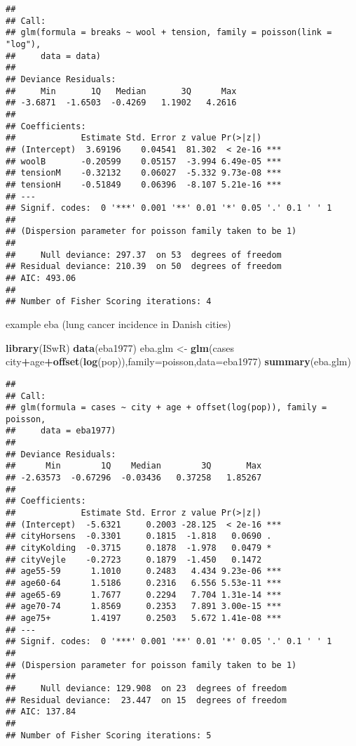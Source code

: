 \documentclass[
]{article}
\newenvironment{Shaded}{\begin{snugshade}}{\end{snugshade}}
\newcommand{\DataTypeTok}[1]{\textcolor[rgb]{0.13,0.29,0.53}{#1}}
\newcommand{\KeywordTok}[1]{\textcolor[rgb]{0.13,0.29,0.53}{\textbf{#1}}}
\newcommand{\NormalTok}[1]{#1}
\newcommand{\OperatorTok}[1]{\textcolor[rgb]{0.81,0.36,0.00}{\textbf{#1}}}
\newcommand{\StringTok}[1]{\textcolor[rgb]{0.31,0.60,0.02}{#1}}
\begin{document}
\begin{verbatim}
## 
## Call:
## glm(formula = breaks ~ wool + tension, family = poisson(link = "log"), 
##     data = data)
## 
## Deviance Residuals: 
##     Min       1Q   Median       3Q      Max  
## -3.6871  -1.6503  -0.4269   1.1902   4.2616  
## 
## Coefficients:
##             Estimate Std. Error z value Pr(>|z|)    
## (Intercept)  3.69196    0.04541  81.302  < 2e-16 ***
## woolB       -0.20599    0.05157  -3.994 6.49e-05 ***
## tensionM    -0.32132    0.06027  -5.332 9.73e-08 ***
## tensionH    -0.51849    0.06396  -8.107 5.21e-16 ***
## ---
## Signif. codes:  0 '***' 0.001 '**' 0.01 '*' 0.05 '.' 0.1 ' ' 1
## 
## (Dispersion parameter for poisson family taken to be 1)
## 
##     Null deviance: 297.37  on 53  degrees of freedom
## Residual deviance: 210.39  on 50  degrees of freedom
## AIC: 493.06
## 
## Number of Fisher Scoring iterations: 4
\end{verbatim}

example eba (lung cancer incidence in Danish cities)

\begin{Shaded}
\begin{Highlighting}[]
\KeywordTok{library}\NormalTok{(ISwR) }
\KeywordTok{data}\NormalTok{(eba1977)}
\NormalTok{eba.glm <-}\StringTok{ }\KeywordTok{glm}\NormalTok{(cases }\OperatorTok{~}\StringTok{ }\NormalTok{city}\OperatorTok{+}\NormalTok{age}\OperatorTok{+}\KeywordTok{offset}\NormalTok{(}\KeywordTok{log}\NormalTok{(pop)),}\DataTypeTok{family=}\NormalTok{poisson,}\DataTypeTok{data=}\NormalTok{eba1977)}
\KeywordTok{summary}\NormalTok{(eba.glm)}
\end{Highlighting}
\end{Shaded}

\begin{verbatim}
## 
## Call:
## glm(formula = cases ~ city + age + offset(log(pop)), family = poisson, 
##     data = eba1977)
## 
## Deviance Residuals: 
##      Min        1Q    Median        3Q       Max  
## -2.63573  -0.67296  -0.03436   0.37258   1.85267  
## 
## Coefficients:
##             Estimate Std. Error z value Pr(>|z|)    
## (Intercept)  -5.6321     0.2003 -28.125  < 2e-16 ***
## cityHorsens  -0.3301     0.1815  -1.818   0.0690 .  
## cityKolding  -0.3715     0.1878  -1.978   0.0479 *  
## cityVejle    -0.2723     0.1879  -1.450   0.1472    
## age55-59      1.1010     0.2483   4.434 9.23e-06 ***
## age60-64      1.5186     0.2316   6.556 5.53e-11 ***
## age65-69      1.7677     0.2294   7.704 1.31e-14 ***
## age70-74      1.8569     0.2353   7.891 3.00e-15 ***
## age75+        1.4197     0.2503   5.672 1.41e-08 ***
## ---
## Signif. codes:  0 '***' 0.001 '**' 0.01 '*' 0.05 '.' 0.1 ' ' 1
## 
## (Dispersion parameter for poisson family taken to be 1)
## 
##     Null deviance: 129.908  on 23  degrees of freedom
## Residual deviance:  23.447  on 15  degrees of freedom
## AIC: 137.84
## 
## Number of Fisher Scoring iterations: 5
\end{verbatim}
\end{document}
